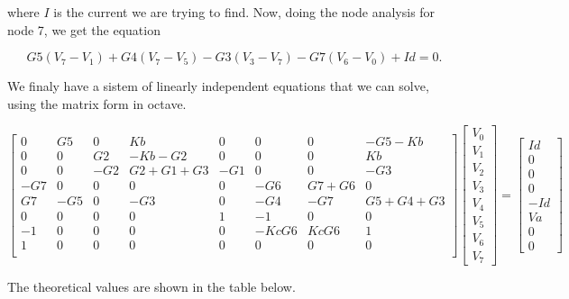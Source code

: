 \noindent where $I$ is the current we are trying to find. Now, doing the node analysis for node 7, we get the equation

 \begin{equation}
  G5(V_7-V_1)+G4(V_7-V_5)-G3(V_3-V_7)-G7(V_6-V_0)+Id = 0.
  \label{eq:N3}
\end{equation}

\par We finaly have a sistem of linearly independent equations that we can solve, using the matrix form in octave.

$$
\begin{bmatrix}
0 & G5 & 0 & Kb & 0 & 0 & 0 & -G5-Kb \\
0 & 0 & G2 & -Kb-G2 & 0 & 0 & 0 & Kb \\
0 & 0 & -G2 & G2+G1+G3 & -G1 & 0 & 0 & -G3 \\
-G7 & 0 & 0 & 0 & 0 & -G6 & G7+G6 & 0 \\
G7 & -G5 & 0 & -G3 & 0 & -G4 & -G7 & G5+G4+G3 \\
0 & 0 & 0 & 0 & 1 & -1 & 0 & 0 \\
-1 & 0 & 0 & 0 & 0 & -KcG6 & KcG6 & 1 \\
1 & 0 & 0 & 0 & 0 & 0 & 0 & 0 \\
\end{bmatrix}
\begin{bmatrix}
V_0 \\
V_1 \\
V_2 \\
V_3 \\
V_4 \\
V_5 \\
V_6 \\
V_7  
\end{bmatrix}
=
\begin{bmatrix}
Id \\
0 \\
0 \\
0 \\
-Id \\
Va \\
0 \\
0  
\end{bmatrix}
$$

The theoretical values are shown in the table below.
\vspace{5mm}
\begin{table}[H]
\centering
\begin{tabularx}{0.8\textwidth} {
  | >{\raggedright\arraybackslash}X
  | >{\raggedleft\arraybackslash}X | }
 \hline

\end{tabularx}
\end{table}

